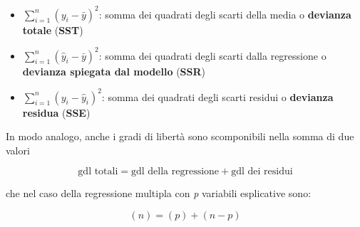 \begin{itemize}
	\item $\sum_{i=1}^n (y_i - \bar{y})^2$: somma dei quadrati degli scarti della media o \textbf{devianza totale} (\textbf{SST})
	\item $\sum_{i=1}^n (\hat{y}_i - \bar{y})^2$: somma dei quadrati degli scarti dalla regressione o \textbf{devianza spiegata dal modello} (\textbf{SSR})
	\item $ \sum_{i=1}^n (y_i - \hat{y}_i)^2 $: somma dei quadrati degli scarti residui o \textbf{devianza residua} (\textbf{SSE})
\end{itemize}

In modo analogo, anche i gradi di libertà sono scomponibili nella somma di due valori

$$
\text{gdl totali} = \text{gdl della regressione} + \text{gdl dei residui}
$$

che nel caso della regressione multipla con \textit{p} variabili esplicative sono:

$$
(n) = (p) + (n-p)
$$




















